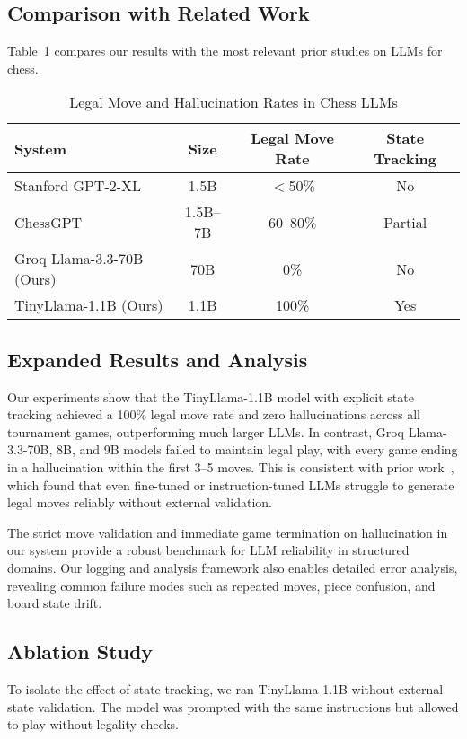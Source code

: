 \documentclass[conference]{IEEEtran}
\begin{document}
\subsection{Comparison with Related Work}
Table~\ref{tab:comparison_prior_work} compares our results with the most relevant prior studies on LLMs for chess.

\begin{table}[H]
\caption{Legal Move and Hallucination Rates in Chess LLMs}
\label{tab:comparison_prior_work}
\centering
\renewcommand{\arraystretch}{1.1}
\setlength{\tabcolsep}{3pt}
\begin{tabular}{|l|c|c|c|}
\hline
\textbf{System} & \textbf{Size} & \textbf{Legal Move Rate} & \textbf{State Tracking} \\
\hline
Stanford GPT-2-XL & 1.5B & $<$50\% & No \\
ChessGPT & 1.5B--7B & 60--80\% & Partial \\
Groq Llama-3.3-70B (Ours) & 70B & 0\% & No \\
TinyLlama-1.1B (Ours) & 1.1B & 100\% & Yes \\
\hline
\end{tabular}
\end{table}

\subsection{Expanded Results and Analysis}
Our experiments show that the TinyLlama-1.1B model with explicit state tracking achieved a 100\% legal move rate and zero hallucinations across all tournament games, outperforming much larger LLMs. In contrast, Groq Llama-3.3-70B, 8B, and 9B models failed to maintain legal play, with every game ending in a hallucination within the first 3--5 moves. This is consistent with prior work~\cite{stanford_gpt2_chess, chessgpt}, which found that even fine-tuned or instruction-tuned LLMs struggle to generate legal moves reliably without external validation.

The strict move validation and immediate game termination on hallucination in our system provide a robust benchmark for LLM reliability in structured domains. Our logging and analysis framework also enables detailed error analysis, revealing common failure modes such as repeated moves, piece confusion, and board state drift.

\subsection{Ablation Study}
To isolate the effect of state tracking, we ran TinyLlama-1.1B without external state validation. The model was prompted with the same instructions but allowed to play without legality checks.
\end{document}
